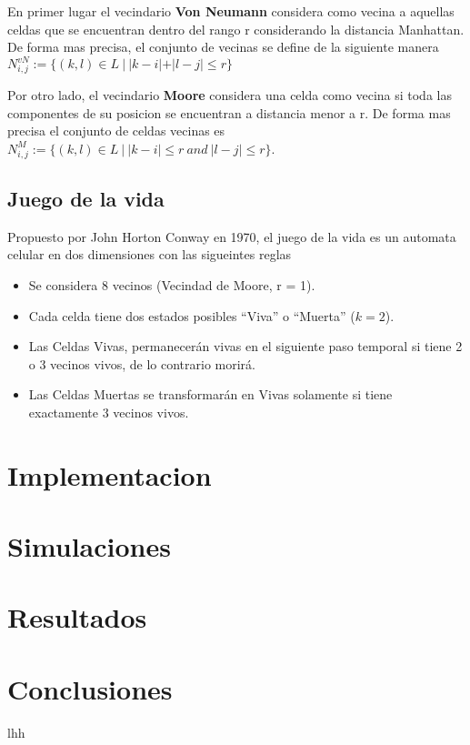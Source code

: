 \documentclass[11pt]{article}
\begin{document}
    En primer lugar el vecindario \textbf{Von Neumann} considera como vecina a aquellas celdas que se encuentran dentro del rango r
    considerando la distancia Manhattan. De forma mas precisa, el conjunto de vecinas se define de la siguiente manera
    $N_{i,j}^{vN}:=\{(k,l) \in L\ |\ |k-i|+ |l - j| \leq r\}$

    Por otro lado, el vecindario \textbf{Moore} considera una celda como vecina si toda las componentes de su posicion se encuentran
    a distancia menor a r. De forma mas precisa el conjunto de celdas vecinas es
    $N_{i,j}^{M}:=\{(k,l) \in L\ |\ |k-i|\leq r\ and\ |l - j| \leq r \}$.

    \subsection{Juego de la vida}
     Propuesto por John Horton Conway en 1970, el juego de la vida es un automata celular en dos dimensiones con las sigueintes reglas
    \begin{itemize}
        \item Se considera 8 vecinos (Vecindad de Moore, r = 1).
        \item Cada celda tiene dos estados posibles “Viva” o “Muerta” ($k=2$).
        \item Las Celdas Vivas, permanecerán vivas en el siguiente paso temporal si tiene 2 o 3 vecinos vivos, de lo contrario morirá.
        \item Las Celdas Muertas se transformarán en Vivas solamente si tiene exactamente 3 vecinos vivos.
    \end{itemize}


    \section{Implementacion}


    \section{Simulaciones}


    \section{Resultados}


    \section{Conclusiones}

    lhh
\end{document}
